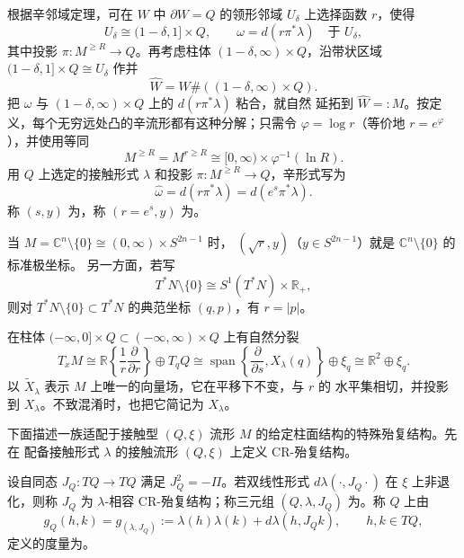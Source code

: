 根据辛邻域定理，可在 $W$ 中 $\partial W=Q$ 的领形邻域 $U_\delta$ 上选择函数
$r$，使得
\begin{equation}
 U_\delta\cong(1-\delta,1]\times Q,
 \qquad \omega=d(r\pi^*\lambda)\quad\text{于 }U_\delta,
\label{eq:17-collar-contact-form}
\end{equation}
其中投影 $\pi:M^{\geq R}\to Q$。再考虑柱体
$(1-\delta,\infty)\times Q$，沿带状区域
$(1-\delta,1]\times Q\cong U_\delta$ 作并
\begin{equation}
 \widehat W=W\#((1-\delta,\infty)\times Q).
\label{eq:17-symplectic-completion}
\end{equation}
把 $\omega$ 与 $(1-\delta,\infty)\times Q$ 上的 $d(r\pi^*\lambda)$ 粘合，就自然
延拓到 $\widehat W=:M$。按定义，每个无穷远处凸的辛流形都有这种分解；只需令
$\varphi=\log r$（等价地 $r=e^\varphi$），并使用等同
\[
 M^{\geq R}=M^{r\geq R}\cong[0,\infty)\times\varphi^{-1}(\ln R).
\]
用 $Q$ 上选定的接触形式 $\lambda$ 和投影 $\pi:M^{\geq R}\to Q$，辛形式写为
\begin{equation}
 \widehat\omega=d(r\pi^*\lambda)=d(e^s\pi^*\lambda).
\label{eq:17-cylindrical-symplectic-form}
\end{equation}
称 $(s,y)$ 为\termCylindricalCoordinates{}，称 $(r=e^s,y)$ 为\termConeCoordinates{}。

\begin{remark}
\label{rem:cone-coordinates-examples}
当
$M=\mathbb C^n\setminus\{0\}\cong(0,\infty)\times S^{2n-1}$ 时，
$(\sqrt r,y)$（$y\in S^{2n-1}$）就是 $\mathbb C^n\setminus\{0\}$ 的标准极坐标。
另一方面，若写
\[
 T^*N\setminus\{0\}\cong S^1(T^*N)\times\mathbb R_+,
\]
则对 $T^*N\setminus\{0\}\subset T^*N$ 的典范坐标 $(q,p)$，有 $r=|p|$。
\end{remark}

在柱体 $(-\infty,0]\times Q\subset(-\infty,\infty)\times Q$ 上有自然分裂
\[
 T_xM\cong\mathbb R\left\{\frac1r\frac\partial{\partial r}\right\}
 \oplus T_qQ
 \cong\operatorname{span}\left\{\frac\partial{\partial s},X_\lambda(q)\right\}
 \oplus\xi_q\cong\mathbb R^2\oplus\xi_q.
\]
以 $\widetilde X_\lambda$ 表示 $M$ 上唯一的向量场，它在平移下不变，与 $r$ 的
水平集相切，并投影到 $X_\lambda$。不致混淆时，也把它简记为 $X_\lambda$。

下面描述一族适配于接触型 $(Q,\xi)$ 流形 $M$ 的给定柱面结构的特殊殆复结构。先在
配备接触形式 $\lambda$ 的接触流形 $(Q,\xi)$ 上定义 CR-殆复结构。

\begin{definition}[接触三元组与三元组度量]
\label{def:contact-triad-metric}
设自同态 $J_Q:TQ\to TQ$ 满足 $J_Q^2=-\Pi$。若双线性形式
$d\lambda(\cdot,J_Q\cdot)$ 在 $\xi$ 上非退化，则称 $J_Q$ 为 $\lambda$-相容
CR-殆复结构；称三元组 $(Q,\lambda,J_Q)$ 为\termContactTriad{}。称 $Q$ 上由
\[
 g_Q(h,k)=g_{(\lambda,J_Q)}:=\lambda(h)\lambda(k)+d\lambda(h,J_Qk),
 \qquad h,k\in TQ,
\]
定义的度量为\termTriadMetric{}。
\end{definition}

